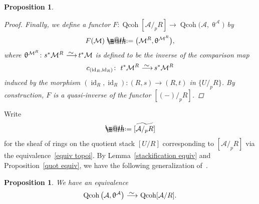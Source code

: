 \documentclass[11pt]{article}
\makeatletter
\numberwithin{equation}{section}
\newtheorem{prop}[dfn]{Proposition}
\newcommand*{\defeq}{\mathrel{\rlap{%
 \raisebox{0.3ex}{$\m@th\cdot$}}%
 \raisebox{-0.3ex}{$\m@th\cdot$}}%
 =}
\numberwithin{equation}{section}
\newcommand{\Qcoh}{\operatorname{Qcoh}}
\newcommand{\id}{\operatorname{id}}
\newcommand{\cA}{\mathcal{A}}
\newcommand{\cM}{\mathcal{M}}
\newcommand{\simto}{\,\,\,\,\raisebox{4pt}{$\sim$}{\kern -1.1em \longrightarrow}\,}
\makeatother
\begin{document}
\begin{prop}
\begin{proof}
Finally, we define a functor $F\colon \Qcoh[\cA/_pR]\to \Qcoh\big(\cA,\uptheta^{\cA}\big)$ by
\begin{gather*}
F(\cM)\defeq\big(\cM^R, \uptheta^{\cM^R}\big),
\end{gather*}
where $\uptheta^{\cM^R}\colon s^*\cM^R\simto t^*\cM$ is defined to be the inverse of the comparison map
\begin{gather*}
c_{(\id_R,\id_R)}\colon\ t^*\cM^R\simto s^*\cM^R
\end{gather*}
induced by the morphism $(\id_R,\id_R)\colon (R,s)\to (R,t)$ in $\{U/_pR\}$. By construction, $F$ is a quasi-inverse of the functor $[(-)/_pR]$.
\end{proof}
\end{prop}

Write
\begin{gather*}
[\cA/R]\defeq\widetilde{[\cA/_pR]}
\end{gather*}
for the sheaf of rings on the quotient stack $[U/R]$ corresponding to $[\cA/_pR]$ via the equivalence~\eqref{equiv topoi}. By Lemma~\ref{stackification equiv} and Proposition~\ref{quot equiv}, we have the following
 generalization of~\cite[Proposition~13.1; 06WT]{stacks}.

\begin{prop}\label{main app}
We have an equivalence
\begin{gather*}
\Qcoh\big(\cA,\uptheta^{\cA}\big)\simto \Qcoh[\cA/R].
\end{gather*}
\end{prop}
\end{document}
